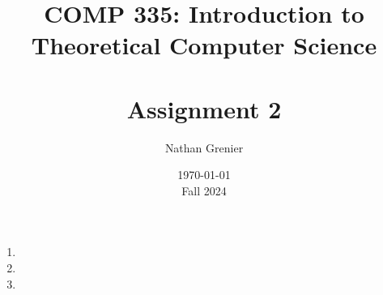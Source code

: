 \documentclass[12pt]{article}
\title{COMP 335: Introduction to Theoretical Computer Science\\
\ \\
Assignment 2}
\author{Nathan Grenier}
\date{\today \\ Fall 2024}
\begin{document}
\begin{spacing}{1.5}
    \maketitle

    \newpage

    \begin{enumerate}

        \item[1.] [ Points]

        \item[2.] [ Points]

        \item[3.] [ Points]

    \end{enumerate}

\end{spacing}
\end{document}
